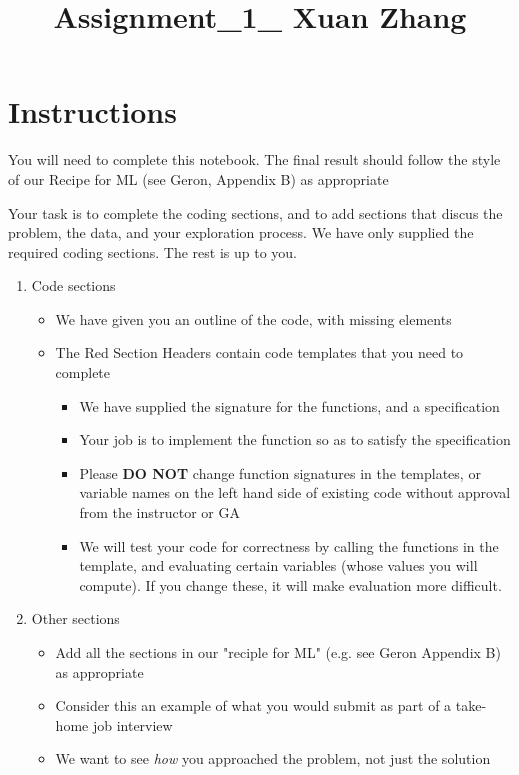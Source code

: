 \documentclass[11pt]{article}
\title{Assignment\_1\_ Xuan Zhang}
\providecommand{\tightlist}{%
      \setlength{\itemsep}{0pt}\setlength{\parskip}{0pt}}
\begin{document}
    
    
    \maketitle
    
    

    
    \section{Instructions}\label{instructions}

You will need to complete this notebook. The final result should follow
the style of our Recipe for ML (see Geron, Appendix B) as appropriate

Your task is to complete the coding sections, and to add sections that
discus the problem, the data, and your exploration process. We have only
supplied the required coding sections. The rest is up to you.

\begin{enumerate}
\def\labelenumi{\arabic{enumi}.}
\tightlist
\item
  Code sections

  \begin{itemize}
  \tightlist
  \item
    We have given you an outline of the code, with missing elements
  \item
    The {Red Section Headers} contain code templates that you need to
    complete

    \begin{itemize}
    \tightlist
    \item
      We have supplied the signature for the functions, and a
      specification
    \item
      Your job is to implement the function so as to satisfy the
      specification
    \item
      Please \textbf{DO NOT} change function signatures in the
      templates, or variable names on the left hand side of existing
      code without approval from the instructor or GA
    \item
      We will test your code for correctness by calling the functions in
      the template, and evaluating certain variables (whose values you
      will compute). If you change these, it will make evaluation more
      difficult.
    \end{itemize}
  \end{itemize}
\item
  Other sections

  \begin{itemize}
  \tightlist
  \item
    Add all the sections in our "reciple for ML" (e.g. see Geron
    Appendix B) as appropriate
  \item
    Consider this an example of what you would submit as part of a
    take-home job interview
  \item
    We want to see \emph{how} you approached the problem, not just the
    solution
  \end{itemize}
\end{enumerate}
\end{document}

